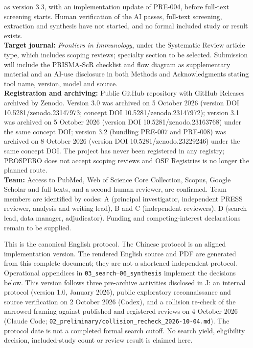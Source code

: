\documentclass[
  11pt,
  a4paper,
]{article}
\begin{document}
as version 3.3, with an implementation update of PRE-004, before
full-text screening starts. Human verification of the AI passes,
full-text screening, extraction and synthesis have not started, and no
formal included study or result exists.\\
\textbf{Target journal:} \emph{Frontiers in Immunology}, under the
Systematic Review article type, which includes scoping reviews;
specialty section to be selected. Submission will include the PRISMA-ScR
checklist and flow diagram as supplementary material and an AI-use
disclosure in both Methods and Acknowledgments stating tool name,
version, model and source.\\
\textbf{Registration and archiving:} Public GitHub repository with
GitHub Releases archived by Zenodo. Version 3.0 was archived on 5
October 2026 (version DOI 10.5281/zenodo.23147973; concept DOI
10.5281/zenodo.23147972); version 3.1 was archived on 5 October 2026
(version DOI 10.5281/zenodo.23163768) under the same concept DOI;
version 3.2 (bundling PRE-007 and PRE-008) was archived on 8 October
2026 (version DOI 10.5281/zenodo.23229246) under the same concept DOI.
The project has never been registered in any registry; PROSPERO does not
accept scoping reviews and OSF Registries is no longer the planned
route.\\
\textbf{Team:} Access to PubMed, Web of Science Core Collection, Scopus,
Google Scholar and full texts, and a second human reviewer, are
confirmed. Team members are identified by codes: A (principal
investigator, independent PRESS reviewer, analysis and writing lead), B
and C (independent reviewers), D (search lead, data manager,
adjudicator). Funding and competing-interest declarations remain to be
supplied.

This is the canonical English protocol. The Chinese protocol is an
aligned implementation version. The rendered English source and PDF are
generated from this complete document; they are not a shortened
independent protocol. Operational appendices in
\texttt{03\_search}--\texttt{06\_synthesis} implement the decisions
below. This version follows three pre-archive activities disclosed in J:
an internal protocol (version 1.0, January 2026), public exploratory
reconnaissance and source verification on 2 October 2026 (Codex), and a
collision re-check of the narrowed framing against published and
registered reviews on 4 October 2026 (Claude Code;
\texttt{02\_preliminary/collision\_recheck\_2026-10-04.md}). The
protocol date is not a completed formal search cutoff. No search yield,
eligibility decision, included-study count or review result is claimed
here.
\end{document}
